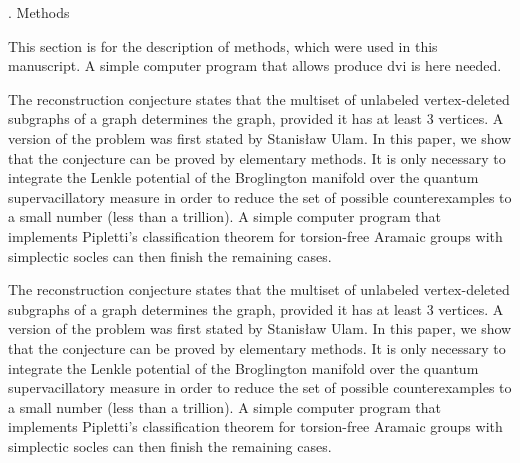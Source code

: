 . Methods

This section is for the description of methods, which were used in this manuscript.
A simple computer program that allows produce dvi is here needed.

The reconstruction conjecture states that the multiset of unlabeled
vertex-deleted subgraphs of a graph determines the graph, provided it
has at least 3 vertices.  A version of the problem was first stated
by Stanis\l aw Ulam.  In this paper, we show that the conjecture can
be proved by elementary methods.  It is only necessary to integrate
the Lenkle potential of the Broglington manifold over the quantum
supervacillatory measure in order to reduce the set of possible
counterexamples to a small number (less than a trillion).  A simple
computer program that implements Pipletti's classification theorem
for torsion-free Aramaic groups with simplectic socles can then
finish the remaining cases.

The reconstruction conjecture states that the multiset of unlabeled
vertex-deleted subgraphs of a graph determines the graph, provided it
has at least 3 vertices.  A version of the problem was first stated
by Stanis\l aw Ulam.  In this paper, we show that the conjecture can
be proved by elementary methods.  It is only necessary to integrate
the Lenkle potential of the Broglington manifold over the quantum
supervacillatory measure in order to reduce the set of possible
counterexamples to a small number (less than a trillion).  A simple
computer program that implements Pipletti's classification theorem
for torsion-free Aramaic groups with simplectic socles can then
finish the remaining cases.

\bye
